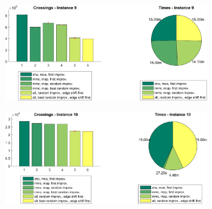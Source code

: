 \documentclass[11pt]{article}
\begin{document}
\begin{figure}[h]
\centering
\includegraphics[width=0.8\textwidth]{instance9}
\end{figure}

\begin{figure}[h]
\centering
\includegraphics[width=0.8\textwidth]{instance10}
\end{figure}
\end{document}
